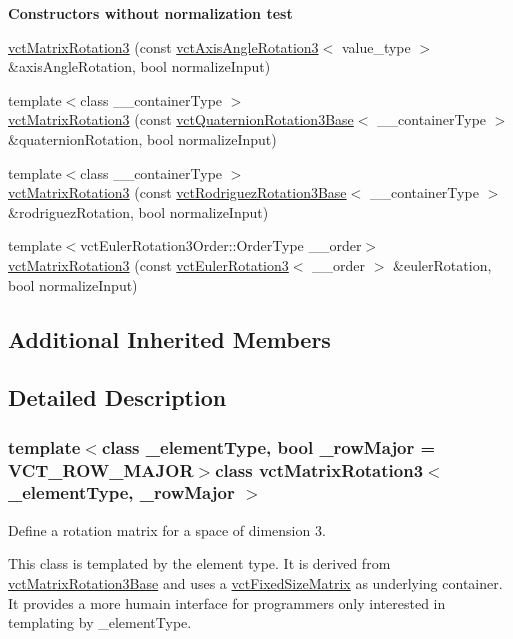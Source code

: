 \begin{Indent}{\bf Constructors without normalization test}
\begin{DoxyCompactItemize}
\item 
\hyperlink{classvct_matrix_rotation3_a794a818e661b4ed6c939a5e28cde63c5}{vct\-Matrix\-Rotation3} (const \hyperlink{classvct_axis_angle_rotation3}{vct\-Axis\-Angle\-Rotation3}$<$ value\-\_\-type $>$ \&axis\-Angle\-Rotation, bool normalize\-Input)
\item 
{\footnotesize template$<$class \-\_\-\-\_\-container\-Type $>$ }\\\hyperlink{classvct_matrix_rotation3_a6f1638454552739b6c9278ae408ed980}{vct\-Matrix\-Rotation3} (const \hyperlink{classvct_quaternion_rotation3_base}{vct\-Quaternion\-Rotation3\-Base}$<$ \-\_\-\-\_\-container\-Type $>$ \&quaternion\-Rotation, bool normalize\-Input)
\item 
{\footnotesize template$<$class \-\_\-\-\_\-container\-Type $>$ }\\\hyperlink{classvct_matrix_rotation3_a3b60836c3ba914b556aa7a4576e35b7f}{vct\-Matrix\-Rotation3} (const \hyperlink{classvct_rodriguez_rotation3_base}{vct\-Rodriguez\-Rotation3\-Base}$<$ \-\_\-\-\_\-container\-Type $>$ \&rodriguez\-Rotation, bool normalize\-Input)
\item 
{\footnotesize template$<$vct\-Euler\-Rotation3\-Order\-::\-Order\-Type \-\_\-\-\_\-order$>$ }\\\hyperlink{classvct_matrix_rotation3_afc300c7621a339cfe1d6dfeeeb9c592a}{vct\-Matrix\-Rotation3} (const \hyperlink{classvct_euler_rotation3}{vct\-Euler\-Rotation3}$<$ \-\_\-\-\_\-order $>$ \&euler\-Rotation, bool normalize\-Input)
\end{DoxyCompactItemize}
\end{Indent}
\subsection*{Additional Inherited Members}


\subsection{Detailed Description}
\subsubsection*{template$<$class \-\_\-element\-Type, bool \-\_\-row\-Major = V\-C\-T\-\_\-\-R\-O\-W\-\_\-\-M\-A\-J\-O\-R$>$class vct\-Matrix\-Rotation3$<$ \-\_\-element\-Type, \-\_\-row\-Major $>$}

Define a rotation matrix for a space of dimension 3. 

This class is templated by the element type. It is derived from \hyperlink{classvct_matrix_rotation3_base}{vct\-Matrix\-Rotation3\-Base} and uses a \hyperlink{classvct_fixed_size_matrix}{vct\-Fixed\-Size\-Matrix} as underlying container. It provides a more humain interface for programmers only interested in templating by \-\_\-element\-Type.



